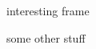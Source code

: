 \documentclass{beamer}
\begin{document}
\begin{frame}
interesting frame
\end{frame}

\begin{frame}
some other stuff
\end{frame}

\begin{frame}
\usebox{\mybox}
\end{frame}
\end{document}
